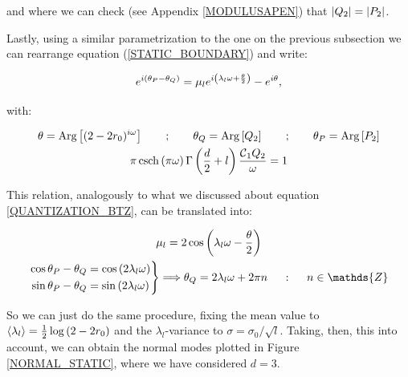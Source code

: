 \documentclass[11pt,a4paper]{article}
\begin{document}
{{\noindent and where we can check (see Appendix \ref{MODULUSAPEN}) that $\left| Q_2 \right|=\left| P_2 \right|$. }

Lastly, using a similar parametrization to the one on the previous subsection we can rearrange equation (\ref{STATIC_BOUNDARY}) and write:

\begin{equation}
    e^{i(\theta_P-\theta_Q)} = \mu_l e^{i\left(\lambda_l\omega + \frac{\theta}{2}\right)}-e^{i\theta},
\end{equation}

{\noindent with:}

\begin{equation}
    \begin{gathered}
        \theta=\text{Arg}\left[(2-2r_0)^{i\omega}\right] ~~~~~~;~~~~~~ \theta_Q=\text{Arg}\left[Q_2\right] ~~~~~~;~~~~~~ \theta_P=\text{Arg}\left[P_2\right]\\
        \pi \operatorname{csch}\left(\pi\omega\right)\Gamma\left(\frac{d}{2}+l\right) \frac{\mbox{${\cal C}$}_1Q_2}{\omega} = 1
    \end{gathered}
\end{equation}

This relation, analogously to what we discussed about equation \ref{QUANTIZATION_BTZ}, can be translated into:

\begin{equation}
    \begin{gathered}
        \mu_l = 2\cos\left(\lambda_l\w - \frac{\theta}{2}\right)\\
        \left.\begin{aligned}
            \cos{\theta_P-\theta_Q} &= \cos{\left(2\lambda_l\w\right)}\\
            \sin{\theta_P-\theta_Q} &= \sin{\left(2\lambda_l\w\right)}
        \end{aligned}\right\}\Longrightarrow \theta_Q = 2\lambda_l\omega +2\pi n ~~~~:~~~~ n\in\mathds{Z}
    \end{gathered}
\end{equation}

{\noindent So we can just do the same procedure, fixing the mean value to $\langle\lambda_l\rangle = \frac{1}{2}\log\left(2-2r_0\right)$ and the $\lambda_l$-variance to $\sigma=\sigma_0/\sqrt{l}$. Taking, then, this into account, we can obtain the normal modes plotted in Figure \ref{NORMAL_STATIC}, where we have considered $d=3$.}

}
\end{document}
